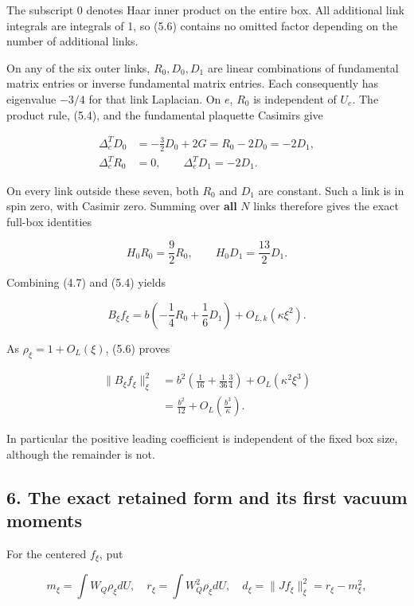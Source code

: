 The subscript 0 denotes Haar inner product on the entire box. All
additional link integrals are integrals of 1, so (5.6) contains no
omitted factor depending on the number of additional links.

On any of the six outer links, \(R_0,D_0,D_1\) are linear combinations
of fundamental matrix entries or inverse fundamental matrix entries.
Each consequently has eigenvalue \(-3/4\) for that link Laplacian. On
\(e\), \(R_0\) is independent of \(U_e\). The product rule, (5.4), and
the fundamental plaquette Casimirs give

\[
\begin{split}
\Delta_e^T D_0
&=-\frac32D_0+2G
=R_0-2D_0=-2D_1,\\
\Delta_e^T R_0&=0,\qquad \Delta_e^T D_1=-2D_1.
\end{split}
\tag{5.7}
\]

On every link outside these seven, both \(R_0\) and \(D_1\) are
constant. Such a link is in spin zero, with Casimir zero. Summing over
\textbf{all} \(N\) links therefore gives the exact full-box identities

\[
H_0R_0=\frac92R_0,\qquad H_0D_1=\frac{13}{2}D_1.
\tag{5.8}
\]

Combining (4.7) and (5.4) yields

\[
B_\xi f_\xi=b\left(-\frac14R_0+\frac16D_1\right)
 +O_{L,k}(\kappa\xi^2).
\tag{5.9}
\]

As \(\rho_\xi=1+O_L(\xi)\), (5.6) proves

\[
\begin{split}
\|B_\xi f_\xi\|_\xi^2
&=b^2\left(\frac1{16}+\frac1{36}\frac34\right)
 +O_L(\kappa^2\xi^3)\\
&=\frac{b^2}{12}+O_L\!\left(\frac{b^3}{\kappa}\right).
\end{split}
\tag{5.10}
\]

In particular the positive leading coefficient is independent of the
fixed box size, although the remainder is not.

\subsection{6. The exact retained form and its first vacuum
moments}\label{bulk-the-exact-retained-form-and-its-first-vacuum-moments}

For the centered \(f_\xi\), put

\[
m_\xi=\int W_Q\rho_\xi dU,\quad
r_\xi=\int W_Q^2\rho_\xi dU,\quad
d_\xi=\|Jf_\xi\|_\xi^2=r_\xi-m_\xi^2,
\]

